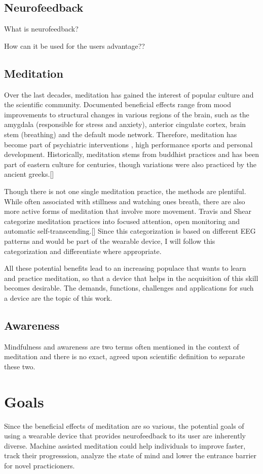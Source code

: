 \documentclass{llncs} %
\begin{document}
\subsection{Neurofeedback}
What is neurofeedback?

How can it be used for the users advantage??
\subsection{Meditation}
Over the last decades, meditation has gained the interest of popular culture and the scientific community.
Documented beneficial effects range from mood improvements to structural changes in various regions of the brain, such as the amygdala (responsible for stress and anxiety), anterior cingulate cortex, brain stem (breathing)
and the default mode network. \cite{Tang:et al}
Therefore, meditation has become part of psychiatric interventions \cite{Hoelzel}, high performance sports and personal development.
Historically, meditation stems from buddhist practices and has been part of eastern culture for centuries, though variations were also practiced by the ancient greeks.[]

Though there is not one single meditation practice, the methods are plentiful. While often associated with stillness and watching ones breath,
there are also more active forms of meditation that involve more movement. Travis and Shear categorize meditation practices into focused attention, open monitoring and automatic self-transcending.[] 
Since this categorization is based on different EEG patterns and would be part of the wearable device, I will follow this categorization and differentiate where appropriate.

All these potential benefits lead to an increasing populace that wants to learn and practice meditation, so that a device that helps in the acquisition of this skill becomes desirable. 
The demands, functions, challenges and applications for such a device are the topic of this work.
\subsection{Awareness}
Mindfulness and awareness are two terms often mentioned in the context of meditation and there is no exact, agreed upon scientific definition to separate these two.
\section{Goals}
Since the beneficial effects of meditation are so various, the potential goals of using a wearable device 
that provides neurofeedback to its user are inherently diverse. Machine assisted meditation could help individuals to 
improve faster, track their progresssion, analyze the state of mind and lower the entrance barrier for novel practicioners. \cite{brand:del} \
\end{document}
